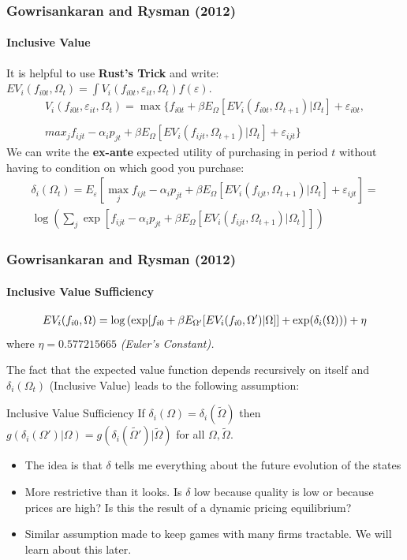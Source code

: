 \documentclass[11pt,aspectratio=169]{beamer}
\begin{document}
\begin{frame}
\frametitle{Gowrisankaran and Rysman (2012)}
\framesubtitle{Inclusive Value}\small
It is helpful to use \textbf{Rust's Trick} and write: $EV_i(f_{i0t},\Omega_t)= \int V_i(f_{i0t},\varepsilon_{it},  \Omega_t)f(\varepsilon)$. 
\begin{multline*}
V_i(f_{i0t},\varepsilon_{i t}, \Omega_t) = \max \{ f_{i0t} + \beta E_{\Omega}[ EV_i (f_{i0t}, \Omega_{t+1}) |\Omega_{t} ] + \varepsilon_{i0t},\\
\\max_j f_{ijt}  -\alpha_i p_{jt} + \beta E_{\Omega}[ E V_i (f_{ijt}, \Omega_{t+1}) |\Omega_{t}] + \varepsilon_{ijt}  \}
\end{multline*}
We can write the \textbf{ex-ante} expected utility of purchasing in period $t$ without having to condition on which good you purchase:
\begin{multline*} 
\delta_{i}(\Omega_t) = E_{\varepsilon} [ \max_j f_{ijt}  -\alpha_i p_{jt} + \beta E_{\Omega}[ E V_i (f_{ijt}, \Omega_{t+1}) |\Omega_{t}] + \varepsilon_{ijt}]=  \\ \log \left( \sum_j \exp[ f_{ijt}  -\alpha_i p_{jt} + \beta E_{\Omega}[ E V_i (f_{ijt}, \Omega_{t+1}) |\Omega_{t}] ]  \right)
\end{multline*}
\end{frame}

\begin{frame}
\frametitle{Gowrisankaran and Rysman (2012)}
\framesubtitle{Inclusive Value Sufficiency}\small
\vspace{-0.8cm}
\begin{eqnarray*}
\small EV_i(f_{i0}, \Omega) = \log\left( \exp[ f_{i0} + \beta E_{\Omega'}[ EV_i (f_{i0}, \Omega') |\Omega]] + \exp(\delta_i(\Omega))  \right) + \eta
\end{eqnarray*}
\footnotesize 
where $\eta = 0.577215665$ \textit{(Euler's Constant).}\\


\vspace{0.2cm}

The fact that the expected value function depends recursively on itself and $\delta_{i}(\Omega_t)$ (Inclusive Value) leads to the following assumption:
\begin{block}{\small Inclusive Value Sufficiency}\footnotesize
If $\delta_i(\Omega) = \delta_i(\tilde{\Omega})$ then $g(\delta_i(\Omega') | \Omega)= g(\delta_i(\tilde{\Omega'}) | \tilde{\Omega})$ for all $\Omega,\tilde{\Omega}$.
\end{block}
\begin{itemize}\footnotesize
\item[$-$] The idea is that $\delta$ tells me everything about the future evolution of the states
\item[$-$] More restrictive than it looks.  Is $\delta$ low because quality is low or because prices are high? Is this the result of a dynamic pricing equilibrium?
\item[$-$] Similar assumption made to keep games with many firms tractable. We will learn about this later. 
\end{itemize}
\end{frame}
\end{document}
